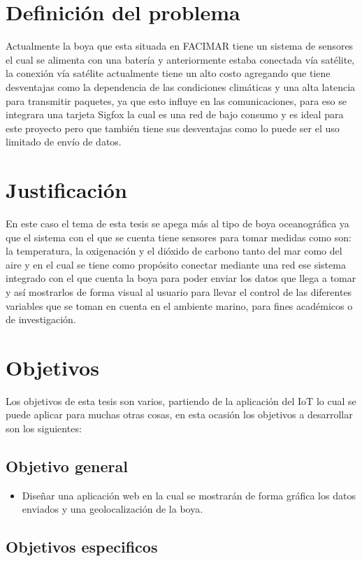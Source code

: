 \documentclass[12pt]{book}
\begin{document}
\section{Definición del problema}
Actualmente la boya que esta situada en FACIMAR tiene un sistema de sensores el cual se alimenta con una batería y anteriormente estaba conectada vía satélite, la conexión vía satélite actualmente tiene un alto costo agregando que tiene desventajas como la dependencia de las condiciones climáticas y una alta latencia para transmitir paquetes, ya que esto influye en las comunicaciones, para eso se integrara una tarjeta Sigfox la cual es una red de bajo consumo y es ideal para este proyecto pero que también tiene sus desventajas como lo puede ser el uso limitado de envío de datos.

\section{Justificación}
En este caso el tema de esta tesis se apega más al tipo de boya oceanográfica ya que el sistema con el que se cuenta tiene sensores para tomar medidas como son: la temperatura, la oxigenación y el dióxido de carbono tanto del mar como del aire y en el cual se tiene como propósito conectar mediante una red ese sistema integrado con el que cuenta la boya para poder enviar los datos que llega a tomar y así mostrarlos de forma visual al usuario para llevar el control de las diferentes variables que se toman en cuenta en el ambiente marino, para fines académicos o de investigación.

\section{Objetivos}
Los objetivos de esta tesis son varios, partiendo de la aplicación del IoT lo cual se puede aplicar para muchas otras cosas, en esta ocasión los objetivos a desarrollar son los siguientes:

\subsection{Objetivo general}

\begin{itemize}
	\item Diseñar una aplicación web en la cual se mostrarán de forma gráfica los datos enviados y una geolocalización de la boya.
\end{itemize}

\subsection{Objetivos especificos}
\end{document}
